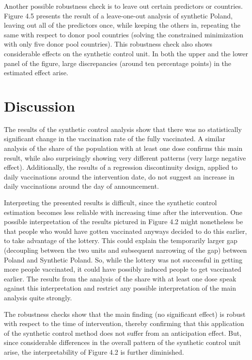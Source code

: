 \documentclass{scrbook}
\begin{document}
Another possible robustness check is to leave out certain predictors or
countries. Figure 4.5 presents the result of a leave-one-out analysis of
synthetic Poland, leaving out all of the predictors once, while keeping
the others in, repeating the same with respect to donor pool countries
(solving the constrained minimization with only five donor pool
countries). This robustness check also shows considerable effects on the
synthetic control unit. In both the upper and the lower panel of the
figure, large discrepancies (around ten percentage points) in the
estimated effect arise.

\chapter{Discussion}

The results of the synthetic control analysis show that there was no
statistically significant change in the vaccination rate of the fully
vaccinated. A similar analysis of the share of the population with at
least one dose confirms this main result, while also surprisingly
showing very different patterns (very large negative effect).
Additionally, the results of a regression discontinuity design, applied
to daily vaccinations around the intervention date, do not suggest an
increase in daily vaccinations around the day of announcement.

Interpreting the presented results is difficult, since the synthetic
control estimation becomes less reliable with increasing time after the
intervention. One possible interpretation of the results pictured in
Figure 4.2 might nonetheless be that people who would have gotten
vaccinated anyways decided to do this earlier, to take advantage of the
lottery. This could explain the temporarily larger gap (decoupling
between the two units and subsequent narrowing of the gap) between
Poland and Synthetic Poland. So, while the lottery was not successful in
getting more people vaccinated, it could have possibly induced people to
get vaccinated earlier. The results from the analysis of the share with
at least one dose speak against this interpretation and restrict any
possible interpretation of the main analysis quite strongly.

The robustness checks show that the main finding (no significant effect)
is robust with respect to the time of intervention, thereby confirming
that this application of the synthetic control method does not suffer
from an anticipation effect. But, since considerable differences in the
overall pattern of the synthetic control unit arise, the
interpretability of Figure 4.2 is further diminished.
\end{document}
